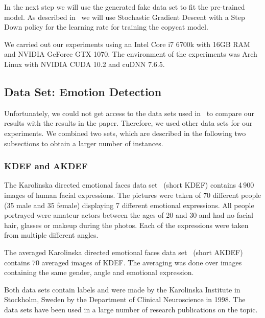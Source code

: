 \documentclass[a4paper,11pt]{article}
\begin{document}
    In the next step we will use the generated fake data set to fit the pre-trained model.
    As described in~\cite{copycat} we will use Stochastic Gradient Descent with a Step Down policy for the learning rate for training the copycat model. 
    
    We carried out our experiments using an Intel Core i7 6700k with 16GB RAM and NVIDIA GeForce GTX 1070. The environment of the experiments was Arch Linux with NVIDIA CUDA 10.2 and cuDNN 7.6.5.
    
    \subsection{Data Set: Emotion Detection}
        Unfortunately, we could not get access to the data sets used in~\cite{copycat} to compare our results with the results in the paper. Therefore, we used other data sets for our experiments. We combined two sets, which are described in the following two subsections to obtain a larger number of instances.
        
        \subsubsection{KDEF and AKDEF} \label{subsec:dataset_KDEF-AKDEF}
            The Karolinska directed emotional faces data set~\cite{kdef} (short KDEF) contains 4\,900 images of human facial expressions. The pictures were taken of 70 different people (35 male and 35 female) displaying 7 different emotional expressions. All people portrayed were amateur actors between the ages of 20 and 30 and had no facial hair, glasses or makeup during the photos. Each of the expressions were taken from multiple different angles. 
            
            The averaged Karolinska directed emotional faces data set~\cite{kdef} (short AKDEF) contains $70$ averaged images of KDEF. The averaging was done over images containing the same gender, angle and emotional expression.
            
            Both data sets contain labels and were made by the Karolinska Institute in Stockholm, Sweden by the Department of Clinical Neuroscience in 1998. The data sets have been used in a large number of research publications on the topic. 
            
\end{document}
